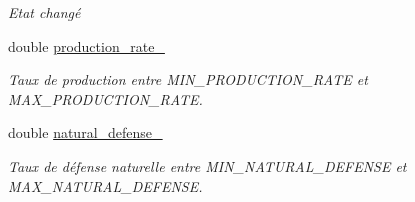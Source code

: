 \begin{DoxyCompactItemize}
\begin{DoxyCompactList}\small\item\em Etat changé \end{DoxyCompactList}\item 
double \hyperlink{classVirtual__planet_a6f8de6a5104185b9c36c64a45260fab6}{production\-\_\-rate\-\_\-}
\begin{DoxyCompactList}\small\item\em Taux de production entre M\-I\-N\-\_\-\-P\-R\-O\-D\-U\-C\-T\-I\-O\-N\-\_\-\-R\-A\-T\-E et M\-A\-X\-\_\-\-P\-R\-O\-D\-U\-C\-T\-I\-O\-N\-\_\-\-R\-A\-T\-E. \end{DoxyCompactList}\item 
double \hyperlink{classVirtual__planet_af62ede97e609fd17818af229799dbe3b}{natural\-\_\-defense\-\_\-}
\begin{DoxyCompactList}\small\item\em Taux de défense naturelle entre M\-I\-N\-\_\-\-N\-A\-T\-U\-R\-A\-L\-\_\-\-D\-E\-F\-E\-N\-S\-E et M\-A\-X\-\_\-\-N\-A\-T\-U\-R\-A\-L\-\_\-\-D\-E\-F\-E\-N\-S\-E. \end{DoxyCompactList}\end{DoxyCompactItemize}
